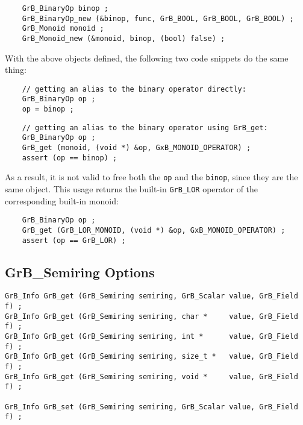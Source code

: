     {\footnotesize
    \begin{verbatim}
    GrB_BinaryOp binop ;
    GrB_BinaryOp_new (&binop, func, GrB_BOOL, GrB_BOOL, GrB_BOOL) ;
    GrB_Monoid monoid ;
    GrB_Monoid_new (&monoid, binop, (bool) false) ; \end{verbatim} }

With the above objects defined, the following two code snippets do the same thing:

    {\footnotesize
    \begin{verbatim}
    // getting an alias to the binary operator directly:
    GrB_BinaryOp op ;
    op = binop ; \end{verbatim} }

    {\footnotesize
    \begin{verbatim}
    // getting an alias to the binary operator using GrB_get:
    GrB_BinaryOp op ;
    GrB_get (monoid, (void *) &op, GxB_MONOID_OPERATOR) ;
    assert (op == binop) ; \end{verbatim} }

As a result, it is not valid to free both the \verb'op' and the \verb'binop',
since they are the same object.  This usage returns the built-in \verb'GrB_LOR'
operator of the corresponding built-in monoid:

    {\footnotesize
    \begin{verbatim}
    GrB_BinaryOp op ;
    GrB_get (GrB_LOR_MONOID, (void *) &op, GxB_MONOID_OPERATOR) ;
    assert (op == GrB_LOR) ; \end{verbatim} }

\newpage
\subsection{{\sf GrB\_Semiring} Options}
\label{get_set_semiring}

\begin{mdframed}[userdefinedwidth=6in]
{\footnotesize
\begin{verbatim}
GrB_Info GrB_get (GrB_Semiring semiring, GrB_Scalar value, GrB_Field f) ;
GrB_Info GrB_get (GrB_Semiring semiring, char *     value, GrB_Field f) ;
GrB_Info GrB_get (GrB_Semiring semiring, int *      value, GrB_Field f) ;
GrB_Info GrB_get (GrB_Semiring semiring, size_t *   value, GrB_Field f) ;
GrB_Info GrB_get (GrB_Semiring semiring, void *     value, GrB_Field f) ;

GrB_Info GrB_set (GrB_Semiring semiring, GrB_Scalar value, GrB_Field f) ;
\end{verbatim}
}\end{mdframed}

